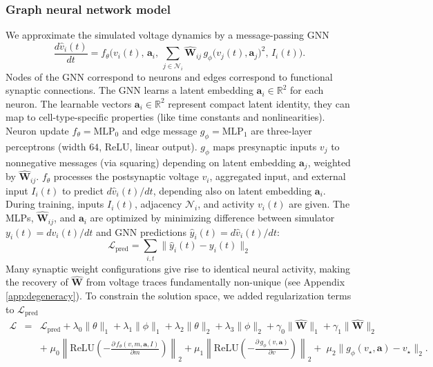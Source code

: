 \documentclass{article}
\begin{document}
\subsubsection*{Graph neural network model} \label{method:GNN}
We approximate the simulated voltage dynamics by a message-passing GNN \citep{gilmer_neural_2017}
\begin{equation}
\frac{d\hat{v}_i(t)}{dt}
= f_\theta\!\Big(v_i(t),\,\mathbf{a}_i,\,
\sum_{j\in\mathcal{N}_i} \hat{\mathbf{W}}_{ij}\,
g_\phi\!\big(v_j(t),\mathbf{a}_j\big)^2,\,
I_i(t)\Big).
\label{eq:gnn_ct}
\end{equation}
Nodes of the GNN correspond to neurons and edges correspond to functional synaptic connections. The GNN learns a latent embedding $\mathbf{a}_i\in\mathbb{R}^2$ for each neuron. The learnable vectors $\mathbf{a}_i\in\mathbb{R}^2$ represent compact latent identity, they can map to cell-type-specific properties (like time constants and nonlinearities). Neuron update $f_\theta=\text{MLP}_0$ and edge message $g_\phi=\text{MLP}_1$ are three-layer perceptrons (width $64$, ReLU, linear output). $g_\phi$ maps presynaptic inputs $v_j$ to nonnegative messages (via squaring) depending on latent embedding $\mathbf{a}_j$, weighted by $\hat{\mathbf{W}}_{ij}$. $f_\theta$ processes the postsynaptic voltage $v_i$, aggregated input, and external input $I_i(t)$ to predict $d\hat{v}_i(t)/dt$, depending also on latent embedding $\mathbf{a}_i$. During training, inputs $I_i(t)$, adjacency $\mathcal{N}_i$, and activity $v_i(t)$ are given. The MLPs, $\hat{\mathbf{W}}_{ij}$, and $\mathbf{a}_i$ are optimized by minimizing difference between simulator $y_i(t)=dv_i(t)/dt$ and GNN predictions $\hat{y}_i(t)=d\hat{v}_i(t)/dt$:
\begin{equation}
\mathcal{L}_{\mathrm{pred}} = \sum_{i,t}\|\hat{y}_i(t) - y_i(t)\|_2
\label{eq:loss_pred}
\end{equation}
Many synaptic weight configurations give rise to identical neural activity, making the recovery of $\hat{\mathbf{W}}$ from voltage traces fundamentally non-unique (see Appendix \ref{app:degeneracy}). To constrain the solution space, we added regularization terms to $\mathcal{L}_{\mathrm{pred}}$
\begin{eqnarray}
\mathcal{L} &=& \mathcal{L}_{\mathrm{pred}}
+ \lambda_0\|\theta\|_1 + \lambda_1\|\phi\|_1 + \lambda_2\|\theta\|_2 + \lambda_3\|\phi\|_2
+ \gamma_0\|\hat{\mathbf{W}}\|_1 + \gamma_1\|\hat{\mathbf{W}}\|_2 \nonumber\\
&& +\; \mu_0\!\left\|\mathrm{ReLU}\!\left(-\tfrac{\partial\,f_\theta(v,m,\mathbf{a},I)}{\partial m}\right)\right\|_2
+ \mu_1\!\left\|\mathrm{ReLU}\!\left(-\tfrac{\partial\,g_\phi(v,\mathbf{a})}{\partial v}\right)\right\|_2 \nonumber +\; \mu_2\|g_\phi(v_\star,\mathbf{a})-v_\star\|_2.
\label{eq:loss_full}
\end{eqnarray}
\end{document}
